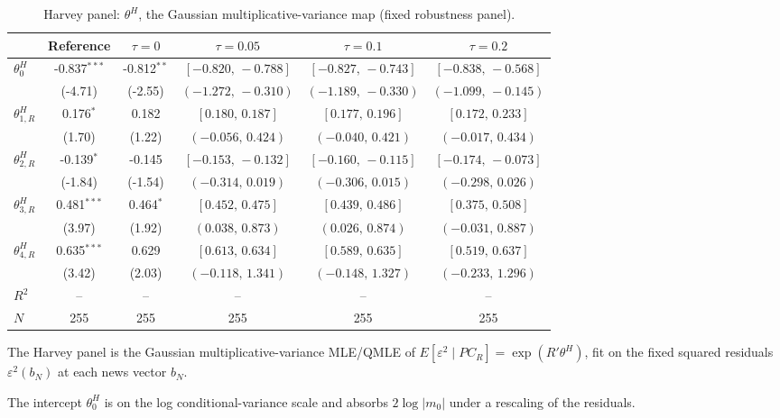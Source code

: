 \documentclass[11pt]{article}
\begin{document}
\begin{table}[!htbp]
\centering
\begin{threeparttable}
\caption{Harvey panel: $\theta^{H}$, the Gaussian multiplicative-variance map (fixed robustness panel).}
\label{tab:log_var_eq_panel_harvey}
\footnotesize\setlength{\tabcolsep}{3pt}
\begin{tabular}{lccccc}
\toprule
 & Reference & $\tau{=}0$ & $\tau{=}0.05$ & $\tau{=}0.1$ & $\tau{=}0.2$ \\
\midrule
$\theta^{H}_0$ & -0.837$^{***}$ & -0.812$^{**}$ & $[-0.820,\,-0.788]$ & $[-0.827,\,-0.743]$ & $[-0.838,\,-0.568]$ \\
 & (-4.71) & (-2.55) & $(-1.272,\,-0.310)$ & $(-1.189,\,-0.330)$ & $(-1.099,\,-0.145)$ \\
\midrule
$\theta^{H}_{1,R}$ & 0.176$^{*}$ & 0.182 & $[0.180,\,0.187]$ & $[0.177,\,0.196]$ & $[0.172,\,0.233]$ \\
 & (1.70) & (1.22) & $(-0.056,\,0.424)$ & $(-0.040,\,0.421)$ & $(-0.017,\,0.434)$ \\
$\theta^{H}_{2,R}$ & -0.139$^{*}$ & -0.145 & $[-0.153,\,-0.132]$ & $[-0.160,\,-0.115]$ & $[-0.174,\,-0.073]$ \\
 & (-1.84) & (-1.54) & $(-0.314,\,0.019)$ & $(-0.306,\,0.015)$ & $(-0.298,\,0.026)$ \\
$\theta^{H}_{3,R}$ & 0.481$^{***}$ & 0.464$^{*}$ & $[0.452,\,0.475]$ & $[0.439,\,0.486]$ & $[0.375,\,0.508]$ \\
 & (3.97) & (1.92) & $(0.038,\,0.873)$ & $(0.026,\,0.874)$ & $(-0.031,\,0.887)$ \\
$\theta^{H}_{4,R}$ & 0.635$^{***}$ & 0.629 & $[0.613,\,0.634]$ & $[0.589,\,0.635]$ & $[0.519,\,0.637]$ \\
 & (3.42) & (2.03) & $(-0.118,\,1.341)$ & $(-0.148,\,1.327)$ & $(-0.233,\,1.296)$ \\
$R^2$ & -- & -- & -- & -- & -- \\
$N$ & 255 & 255 & 255 & 255 & 255 \\
\bottomrule
\end{tabular}
\begin{tablenotes}[flushleft]
\scriptsize
\item The Harvey panel is the Gaussian multiplicative-variance MLE/QMLE of $E[\varepsilon^2 \mid PC_R] = \exp(R'\theta^{H})$, fit on the fixed squared residuals $\varepsilon^2(b_N)$ at each news vector $b_N$.
\item The intercept $\theta^{H}_0$ is on the log conditional-variance scale and absorbs $2\log|m_0|$ under a rescaling of the residuals.

\end{tablenotes}
\end{threeparttable}
\end{table}
\end{document}
